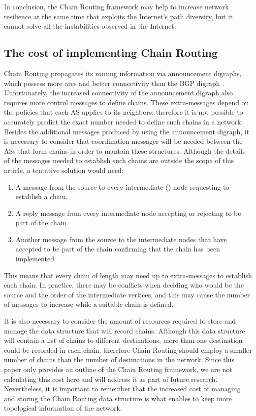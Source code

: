 \documentclass[5p,twocolumn]{elsarticle}
\begin{document}
In conclusion, the Chain Routing framework may help to increase network resilience at the same time that exploits the Internet's path diversity, but it cannot solve all the instabilities observed in the Internet.


\subsection{The cost of implementing Chain Routing}\label{the_cost}



Chain Routing propagates its routing information via announcement digraphs, which possess more arcs and better connectivity than the BGP digraph \cite{Arjona-Villicana2010}. Unfortunately, the increased connectivity of the announcement digraph also requires more control messages to define chains. These extra-messages depend on the policies that each AS applies to its neighbors; therefore it is not possible to accurately predict the exact number needed to define such chains in a network. Besides the additional messages produced by using the announcement digraph, it is necessary to consider that coordination messages will be needed between the ASs that form chains in order to mantain these structures. Although the details of the messages needed to establish such chains are outside the scope of this article, a tentative solution would need:

\begin{enumerate}
	\item A message from the source to every intermediate () node requesting to establish a chain.
	\item A reply message from every intermediate node accepting or rejecting to be part of the chain.
	\item Another message from the source to the intermediate nodes that have accepted to be part of the chain confirming that the chain has been implemented.
\end{enumerate}





This means that every chain of length  may need up to  extra-messages to establish each chain. In practice, there may be conflicts when deciding who would be the source and the order of the intermediate vertices, and this may cause the number of messages to increase while a suitable chain is defined.

It is also necessary to consider the amount of resources required to store and manage the data structure that will record chains. Although this data structure will contain a list of chains to different destinations, more than one destination could be recorded in each chain, therefore Chain Routing should employ a smaller number of chains than the number of destinations in the network. Since this paper only provides an outline of the Chain Routing framework, we are not calculating this cost here and will address it as part of future research. Nevertheless, it is important to remember that the increased cost of managing and storing the Chain Routing data structure is what enables to keep more topological information of the network.
\end{document}
